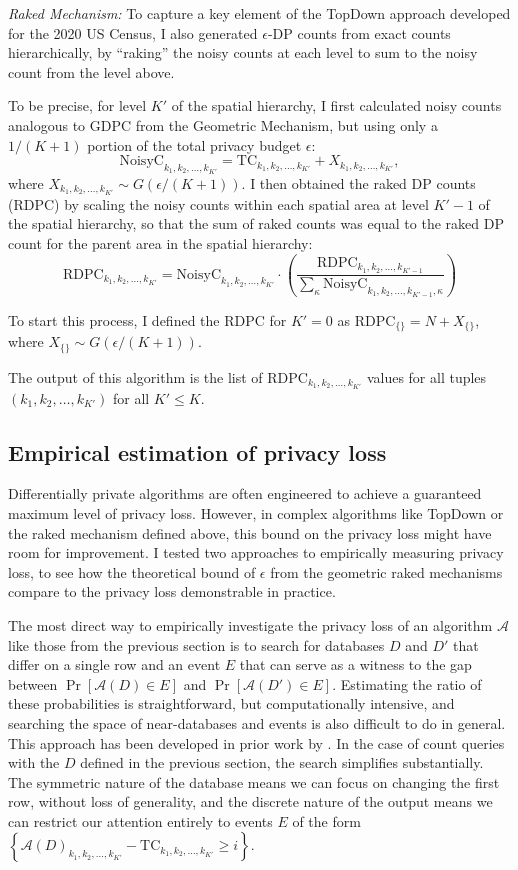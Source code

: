 \documentclass{article}
\begin{document}
\emph{Raked Mechanism:} To capture a key element of the TopDown approach developed for the 2020 US Census, I also generated $\epsilon$-DP counts from exact counts hierarchically, by ``raking'' the noisy counts at each level to sum to the noisy count from the level above.

To be precise, for level $K'$ of the spatial hierarchy, I first calculated noisy counts analogous to $\mathrm{GDPC}$ from the Geometric Mechanism, but using only a $1/(K+1)$ portion of the total privacy budget $\epsilon$:
$$
\mathrm{NoisyC}_{k_1, k_2, \ldots, k_{K'}} = \mathrm{TC}_{k_1, k_2, \ldots, k_{K'}} + X_{k_1, k_2, \ldots, k_{K'}},
$$
where $X_{k_1, k_2, \ldots, k_{K'}} \sim G(\epsilon/(K+1))$.
I then obtained the raked DP counts (RDPC) by scaling the noisy counts within each spatial area at level $K'-1$ of the spatial hierarchy, so that the sum of raked counts was equal to the raked DP count for the parent area in the spatial hierarchy:
$$
\mathrm{RDPC}_{k_1, k_2, \ldots, k_{K'}} = 
\mathrm{NoisyC}_{k_1, k_2, \ldots, k_{K'}}\cdot
\left(\frac
{\mathrm{RDPC}_{k_1,k_2,\ldots, k_{K'-1}}}
{\sum_\kappa \mathrm{NoisyC}_{k_1, k_2, \ldots, k_{K'-1}, \kappa}}
\right)
$$

To start this process, I defined the RDPC for $K' = 0$ as
$\mathrm{RDPC}_{\{\}} = N + X_{\{\}}$, where $X_{\{\}} \sim G(\epsilon/(K+1))$.

The output of this algorithm is the list of $
\mathrm{RDPC}_{k_1, k_2, \ldots, k_{K'}}$ values for all tuples $(k_1, k_2, \ldots, k_{K'})$ for all $K' \leq K$.

\subsection{Empirical estimation of privacy loss}
Differentially private algorithms are often engineered to achieve a guaranteed maximum level of privacy loss.  However, in complex algorithms like TopDown or the raked mechanism defined above, this bound on the privacy loss might have room for improvement.  I tested two approaches to empirically measuring privacy loss, to see how the theoretical bound of $\epsilon$ from the geometric raked mechanisms compare to the privacy loss demonstrable in practice.

The most direct way to empirically investigate the privacy loss of an algorithm $\mathcal{A}$ like those from the previous section is to search for databases $D$ and $D'$ that differ on a single row and an event $E$ that can serve as a witness to the gap between $\Pr[\mathcal{A}(D) \in E]$ and $\Pr[\mathcal{A}(D') \in E]$.  Estimating the ratio of these probabilities is straightforward, but computationally intensive, and searching the space of near-databases and events is also difficult to do in general.  This approach has been developed in prior work by \citet{TK}.  In the case of count queries with the $D$ defined in the previous section, the search simplifies substantially.  The symmetric nature of the database means we can focus on changing the first row, without loss of generality, and the discrete nature of the output means we can restrict our attention entirely to events $E$ of the form $\left\{\mathcal{A}(D)_{k_1, k_2, \ldots, k_{K'}}
- \mathrm{TC}_{k_1, k_2, \ldots, k_{K'}}
\geq i\right\}$.
\end{document}
